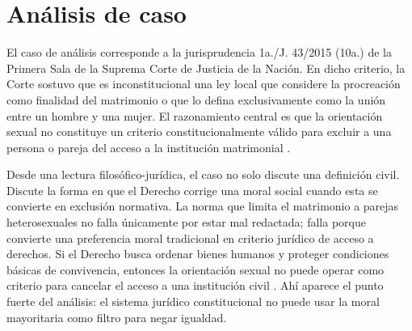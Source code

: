 \documentclass[
	spanish,
	letterpaper, oneside
]{article}
\begin{document}
\section{Análisis de caso}

El caso de análisis corresponde a la jurisprudencia 1a./J. 43/2015 (10a.) de la Primera Sala de la Suprema Corte de Justicia de la Nación. En dicho criterio, la Corte sostuvo que es inconstitucional una ley local que considere la procreación como finalidad del matrimonio o que lo defina exclusivamente como la unión entre un hombre y una mujer. El razonamiento central es que la orientación sexual no constituye un criterio constitucionalmente válido para excluir a una persona o pareja del acceso a la institución matrimonial \citep{scjnMatrimonio2015}.

Desde una lectura filosófico-jurídica, el caso no solo discute una definición civil. Discute la forma en que el Derecho corrige una moral social cuando esta se convierte en exclusión normativa. La norma que limita el matrimonio a parejas heterosexuales no falla únicamente por estar mal redactada; falla porque convierte una preferencia moral tradicional en criterio jurídico de acceso a derechos. Si el Derecho busca ordenar bienes humanos y proteger condiciones básicas de convivencia, entonces la orientación sexual no puede operar como criterio para cancelar el acceso a una institución civil \citep{finnisEstudiosTeoriaDerecho2017,scjnMatrimonio2015}. Ahí aparece el punto fuerte del análisis: el sistema jurídico constitucional no puede usar la moral mayoritaria como filtro para negar igualdad.
\end{document}
